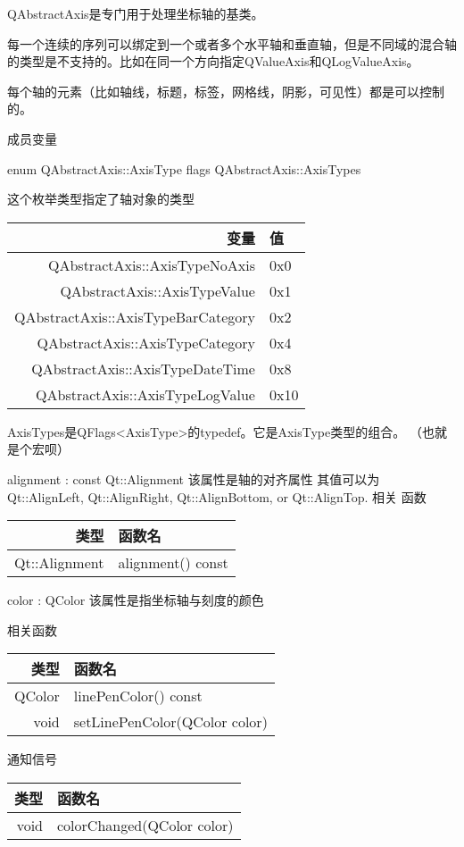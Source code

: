 QAbstractAxis是专门用于处理坐标轴的基类。

每一个连续的序列可以绑定到一个或者多个水平轴和垂直轴，但是不同域的混合轴的类型是不支持的。比如在同一个方向指定QValueAxis和QLogValueAxis。

每个轴的元素（比如轴线，标题，标签，网格线，阴影，可见性）都是可以控制的。

成员变量

enum QAbstractAxis::AxisType flags QAbstractAxis::AxisTypes

这个枚举类型指定了轴对象的类型

\begin{tabular}{|r|l|}
\hline
变量&值\\
\hline
QAbstractAxis::AxisTypeNoAxis&	0x0\\
\hline
QAbstractAxis::AxisTypeValue&	0x1\\
\hline
QAbstractAxis::AxisTypeBarCategory&	0x2\\
\hline
QAbstractAxis::AxisTypeCategory&	0x4\\
\hline
QAbstractAxis::AxisTypeDateTime&	0x8\\
\hline
QAbstractAxis::AxisTypeLogValue&	0x10\\
\hline
\end{tabular}

AxisTypes是QFlags<AxisType>的typedef。它是AxisType类型的组合。 （也就是个宏呗）

alignment : const Qt::Alignment 该属性是轴的对齐属性 其值可以为
Qt::AlignLeft, Qt::AlignRight, Qt::AlignBottom, or Qt::AlignTop. 相关
函数

\begin{tabular}{|r|l|}
\hline
类型&函数名\\
\hline
Qt::Alignment&	alignment() const\\
\hline
\end{tabular}

\splitLine

color : QColor 该属性是指坐标轴与刻度的颜色

相关函数

\begin{tabular}{|r|l|}
\hline
类型 & 函数名\\
\hline
QColor&	linePenColor() const\\
\hline
void&	setLinePenColor(QColor color)\\
\hline
\end{tabular}

通知信号

\begin{tabular}{|r|l|}
\hline
类型&函数名\\ 
\hline
void	&colorChanged(QColor color)\\
\hline
\end{tabular}

